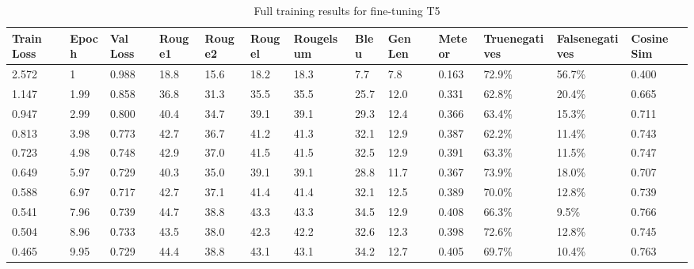 \begin{appendices}
\begin{table}[!ht]
\begin{adjustwidth}{-1.8cm}{}
  \centering
  \begin{tabular}{p{0.8cm}|l|p{0.8cm}|l|l|l|p{1.1cm}|l|p{0.7cm}|l|p{1.5cm}|p{1.5cm}|p{1.2cm}}
        \textbf{Train Loss} & \textbf{Epoch} & \textbf{Val Loss} & \textbf{Rouge1} & \textbf{Rouge2} & \textbf{Rougel} & \textbf{Rougelsum} & \textbf{Bleu} & \textbf{Gen Len} & \textbf{Meteor} & \textbf{True\newline negatives} & \textbf{False\newline negatives} & \textbf{Cosine Sim} \\ \hline
        2.572 & 1 & 0.988 & 18.8 & 15.6 & 18.2 & 18.3 & 7.7 & 7.8 & 0.163 & 72.9\% & 56.7\% & 0.400 \\ \hline
        1.147 & 1.99 & 0.858 & 36.8 & 31.3 & 35.5 & 35.5 & 25.7 & 12.0 & 0.331 & 62.8\% & 20.4\% & 0.665 \\ \hline
        0.947 & 2.99 & 0.800 & 40.4 & 34.7 & 39.1 & 39.1 & 29.3 & 12.4 & 0.366 & 63.4\% & 15.3\% & 0.711 \\ \hline
        0.813 & 3.98 & 0.773 & 42.7 & 36.7 & 41.2 & 41.3 & 32.1 & 12.9 & 0.387 & 62.2\% & 11.4\% & 0.743 \\ \hline
        0.723 & 4.98 & 0.748 & 42.9 & 37.0 & 41.5 & 41.5 & 32.5 & 12.9 & 0.391 & 63.3\% & 11.5\% & 0.747 \\ \hline
        0.649 & 5.97 & 0.729 & 40.3 & 35.0 & 39.1 & 39.1 & 28.8 & 11.7 & 0.367 & 73.9\% & 18.0\% & 0.707 \\ \hline
        0.588 & 6.97 & 0.717 & 42.7 & 37.1 & 41.4 & 41.4 & 32.1 & 12.5 & 0.389 & 70.0\% & 12.8\% & 0.739 \\ \hline
        0.541 & 7.96 & 0.739 & 44.7 & 38.8 & 43.3 & 43.3 & 34.5 & 12.9 & 0.408 & 66.3\% & 9.5\% & 0.766 \\ \hline
        0.504 & 8.96 & 0.733 & 43.5 & 38.0 & 42.3 & 42.2 & 32.6 & 12.3 & 0.398 & 72.6\% & 12.8\% & 0.745 \\ \hline
        0.465 & 9.95 & 0.729 & 44.4 & 38.8 & 43.1 & 43.1 & 34.2 & 12.7 & 0.405 & 69.7\% & 10.4\% & 0.763 \\
  \end{tabular}
  \caption{Full training results for fine-tuning T5}
  \label{tab:longheaders}
\end{adjustwidth}
\end{table}


\end{appendices}